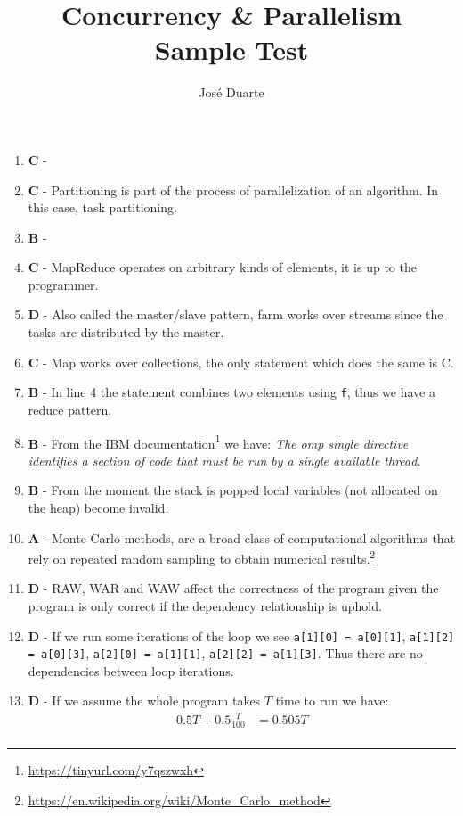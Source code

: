 \documentclass[a4paper,twocolumn]{article}
\title{Concurrency \& Parallelism\\Sample Test}
\author{José Duarte}
\begin{document}
\maketitle
\begin{enumerate}
    \item \textbf{C} -
    \item \textbf{C} - Partitioning is part of the process of parallelization of an algorithm. In this case, task partitioning.
    \item \textbf{B} -
    \item \textbf{C} - MapReduce operates on arbitrary kinds of elements, it is up to the programmer.
    \item \textbf{D} - Also called the master/slave pattern, farm works over streams since the tasks are distributed by the master.
    \item \textbf{C} - Map works over collections, the only statement which does the same is C.
    \item \textbf{B} - In line 4 the statement combines two elements using \texttt{f}, thus we have a reduce pattern.
    \item \textbf{B} - From the IBM documentation\footnote{\url{https://tinyurl.com/y7qszwxh}} we have:
    \textit{The omp single directive identifies a section of code that must be run by a single available thread.}
    \item \textbf{B} - From the moment the stack is popped local variables (not allocated on the heap) become invalid.
    \item \textbf{A} - Monte Carlo methods, are a broad class of computational algorithms that rely on repeated random sampling to obtain numerical results.\footnote{\url{https://en.wikipedia.org/wiki/Monte_Carlo_method}}
    \item \textbf{D} - RAW, WAR and WAW affect the correctness of the program given the program is only correct if the dependency relationship is uphold.
    \item \textbf{D} - If we run some iterations of the loop we see \texttt{a[1][0] = a[0][1]}, \texttt{a[1][2] = a[0][3]}, \texttt{a[2][0] = a[1][1]}, \texttt{a[2][2] = a[1][3]}.
    Thus there are no dependencies between loop iterations.
    \item \textbf{D} - If we assume the whole program takes $T$ time to run we have:
    \begin{equation*}
        \begin{split}
            0.5 T + 0.5\frac{T}{100} & = 0.505T \\

\end{split}
\end{equation*}
\end{enumerate}
\end{document}
